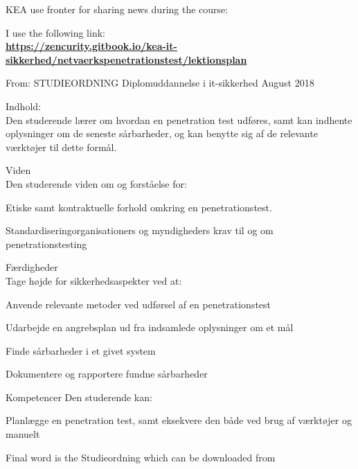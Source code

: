 \documentclass[Screen16to9,17pt]{foils}
\begin{document}


KEA use fronter for sharing news during the course:\\

I use the following link:\\
{\bf\url{https://zencurity.gitbook.io/kea-it-sikkerhed/netvaerkspenetrationstest/lektionsplan}}



From: STUDIEORDNING Diplomuddannelse i it-sikkerhed August 2018

Indhold:\\
Den studerende lærer om hvordan en penetration test udføres, samt kan indhente oplysninger om de seneste sårbarheder, og kan benytte sig af de relevante værktøjer til dette formål.

Viden\\
Den studerende viden om og forståelse for:
\begin{list2}
\item Etiske samt kontraktuelle forhold omkring en penetrationstest.
\item Standardiseringorganisationers og myndigheders krav til og om penetrationstesting
\end{list2}

Færdigheder\\
Tage højde for sikkerhedsaspekter ved at:
\begin{list2}
\item Anvende relevante metoder ved udførsel af en penetrationstest
\item Udarbejde en angrebsplan ud fra indsamlede oplysninger om et mål
\item Finde sårbarheder i et givet system
 \item Dokumentere og rapportere fundne sårbarheder
\end{list2}

Kompetencer
Den studerende kan:
\begin{list2}
\item Planlægge en penetration test, samt eksekvere den både ved brug af værktøjer og manuelt
\end{list2}



Final word is the Studieordning which can be downloaded from\\
{\footnotesize {}\\
}
\end{document}
